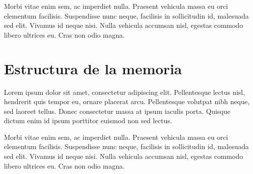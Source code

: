 Morbi vitae enim sem, ac imperdiet nulla. Praesent vehicula massa eu orci
elementum facilisis. Suspendisse nunc neque, facilisis in sollicitudin id,
malesuada sed elit. Vivamus id neque nisi. Nulla vehicula accumsan nisl, egestas
commodo libero ultrices eu. Cras non odio magna.

\section*{Estructura de la memoria}

Lorem ipsum dolor sit amet, consectetur adipiscing elit. Pellentesque lectus
nisl, hendrerit quis tempor eu,
ornare placerat arcu. Pellentesque volutpat nibh
neque, sed laoreet tellus. Donec consectetur massa
 at ipsum iaculis porta.
Quisque dictum enim id ipsum porttitor euismod non sed lectus.

Morbi vitae enim sem, ac imperdiet nulla. Praesent vehicula massa eu orci
elementum facilisis. Suspendisse nunc neque, facilisis in sollicitudin id,
malesuada sed elit. Vivamus id neque nisi. Nulla vehicula accumsan nisl, egestas
commodo libero ultrices eu. Cras non odio magna.